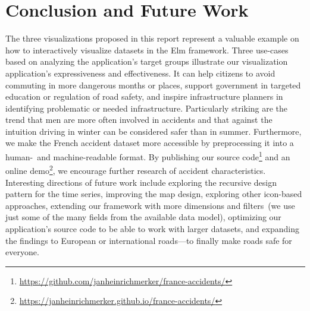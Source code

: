 \section{Conclusion and Future Work}
The three visualizations proposed in this report represent a valuable example on how to interactively visualize datasets in the Elm framework.
Three use-cases based on analyzing the application's target groups illustrate our visualization application's expressiveness and effectiveness.
It can \Ni help citizens to avoid commuting in more dangerous months or places, \Nii support government in targeted education or regulation of road safety, and \Niii inspire infrastructure planners in identifying problematic or needed infrastructure.
Particularly striking are the trend that men are more often involved in accidents and that against the intuition driving in winter can be considered safer than in summer.
Furthermore, we make the French accident dataset more accessible by preprocessing it into a human-~and machine-readable format.
By publishing our source code\footnote{\url{https://github.com/janheinrichmerker/france-accidents/}} and an online demo\footnote{\url{https://janheinrichmerker.github.io/france-accidents/}}, we encourage further research of accident characteristics.
Interesting directions of future work include exploring the recursive design pattern for the time series, improving the map design, exploring other icon-based approaches, extending our framework with more dimensions and filters~(we use just some of the many fields from the available data model), optimizing our application's source code to be able to work with larger datasets, and expanding the findings to European or international roads---to finally make roads safe for everyone.
